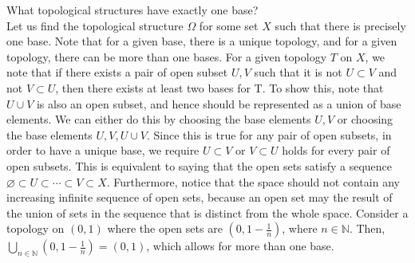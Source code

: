 \documentclass[document]{article}
\begin{document}
\begin{problem}[3.4] What topological structures have exactly one base?\\


Let us find the topological structure $\Omega$ for some set $X$ such that there is precisely one base. Note that for a given base, there is a unique topology, and for a given topology, there can be more than one bases. For a given topology $T$ on $X$, we note that if there exists a pair of open subset $U, V$ such that it is not $U \subset V$ and not $V \subset U$, then there exists at least two bases for T. To show this, note that $U \cup V$ is also an open subset, and hence should be represented as a union of base elements. We can either do this by choosing the base elements $U, V$ or choosing the base elements $U, V, U \cup V$. Since this is true for any pair of open subsets, in order to have a unique base, we require $U \subset V$ or $V \subset U$ holds for every pair of open subsets. This is equivalent to saying that the open sets satisfy a sequence $\varnothing \subset U \subset \cdots \subset V \subset X$. Furthermore, notice that the space should not contain any increasing infinite sequence of open sets, because an open set may the result of the union of sets in the sequence that is distinct from the whole space. Consider a topology on $(0,1)$ where the open sets are $(0, 1-\frac{1}{n})$, where $n \in \mathbb{N}$. Then, $\bigcup_{n\in\mathbb{N}} (0, 1-\frac{1}{n}) = (0,1)$, which allows for more than one base. 
\end{problem} %
\end{document}
